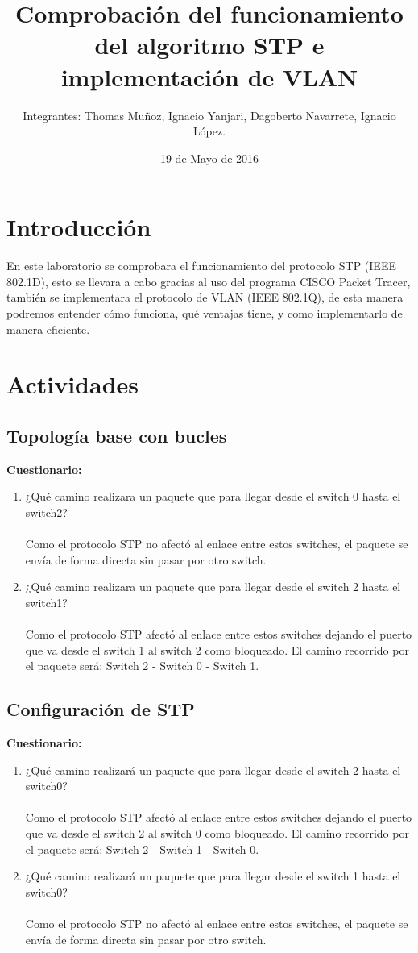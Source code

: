 \documentclass{udpreport}
\title{Comprobación del funcionamiento del algoritmo STP e implementación de VLAN}
\author{Integrantes: Thomas Muñoz, Ignacio Yanjari, Dagoberto Navarrete, Ignacio López.}
\date{19 de Mayo de 2016}
\begin{document}
\maketitle
\tableofcontents
\listoffigures
\chapter{Introducción}
  En este laboratorio se comprobara el funcionamiento del protocolo STP (IEEE 802.1D),  esto se llevara a cabo gracias al uso del programa CISCO Packet Tracer, también se implementara el protocolo de  VLAN (IEEE 802.1Q), de esta manera podremos entender cómo funciona, qué  ventajas tiene, y como implementarlo de manera eficiente.
\chapter{Actividades}
	\section{Topología base con bucles}
	
	{\large \bf{Cuestionario: }}\\
	\begin{enumerate}
	    \item ¿Qué camino realizara un paquete que para llegar desde el switch
0 hasta el switch2?\\\\
    Como el protocolo STP no afectó al enlace entre estos switches, el paquete se envía de forma directa sin pasar por otro switch.
    
        \item ¿Qué camino realizara un paquete que para llegar desde el switch
2 hasta el switch1?\\\\
    Como el protocolo STP afectó al enlace entre estos switches dejando el puerto que va desde el switch 1 al switch 2 como bloqueado. El camino recorrido por el paquete será: Switch 2 - Switch 0 - Switch 1. 
	\end{enumerate}
	\section{Configuración de STP}
	
	{\large \bf{Cuestionario: }}\\
	\begin{enumerate}
	    \item ¿Qué camino realizará un paquete que para llegar desde el switch
2 hasta el switch0?\\\\
        Como el protocolo STP afectó al enlace entre estos switches dejando el puerto que va desde el switch 2 al switch 0 como bloqueado. El camino recorrido por el paquete será: Switch 2 - Switch 1 - Switch 0. 
        \item  ¿Qué camino realizará un paquete que para llegar desde el switch
1 hasta el switch0?\\\\
          Como el protocolo STP no afectó al enlace entre estos switches, el paquete se envía de forma directa sin pasar por otro switch.
	\end{enumerate}
\end{document}
